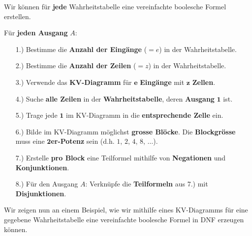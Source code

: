 Wir können für \textbf{jede} Wahrheitstabelle eine vereinfachte boolesche Formel erstellen.

\begin{important}
Für \textbf{jeden Ausgang} $A$:
\begin{enumerate}
\item[1.)] Bestimme die \textbf{Anzahl der Eingänge} ($=e$) in der Wahrheitstabelle.
\item[2.)] Bestimme die \textbf{Anzahl der Zeilen} ($=z$) in der Wahrheitstabelle.
\item[3.)] Verwende das \textbf{\acs{KV}-Diagramm} für $\mathbf{e}$ \textbf{Eingänge} mit $\mathbf{z}$ \textbf{Zellen}.
\item[4.)] Suche \textbf{alle Zeilen} in der \textbf{Wahrheitstabelle}, deren \textbf{Ausgang} $\mathbf{1}$ ist.
\item[5.)] Trage jede $\mathbf{1}$ im \acs{KV}-Diagramm in die \textbf{entsprechende Zelle} ein.
\item[6.)] Bilde im \acs{KV}-Diagramm möglichst \textbf{grosse Blöcke}. Die \textbf{Blockgrösse} muss eine $\mathbf{2}$\textbf{er-Potenz} sein (d.h. $1$, $2$, $4$, $8$, $\dots$).
\item[7.)] Erstelle \textbf{pro Block} eine Teilformel mithilfe von \textbf{Negationen} und \textbf{Konjunktionen}.
\item[8.)] Für den Ausgang $A$: Verknüpfe die \textbf{Teilformeln} aus 7.) mit \textbf{Disjunktionen}.
\end{enumerate}
\end{important}

\vfill

\newpage

Wir zeigen nun an einem Beispiel, wie wir mithilfe eines \ac{KV}-Diagramms für eine gegebene Wahrheitstabelle eine vereinfachte boolesche Formel in \ac{DNF} erzeugen können.

